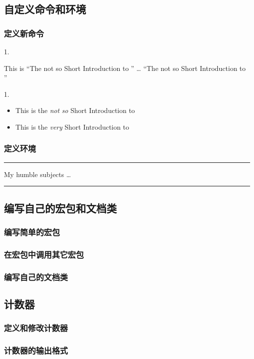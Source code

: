 \documentclass[12pt,UTF8]{ctexart}%
\begin{document}
\subsection{自定义命令和环境}

\subsubsection{定义新命令}

1.\par
\newcommand{\tnss}{The not
so Short Introduction to
\LaTeXe}
This is ``\tnss'' \ldots{}
``\tnss''

1.\par
\newcommand{\txsit}[1]
{This is the \emph{#1} Short
Introduction to \LaTeXe}
\begin{itemize}
\item \txsit{not so}
\item \txsit{very}
\end{itemize}

\subsubsection{定义环境}

\newenvironment{king}
{\rule{1ex}{1ex}%
\hspace{\stretch{1}}}
{%
\rule{1ex}{1ex}}
\begin{king}
My humble subjects \ldots
\end{king}

\subsection{编写自己的宏包和文档类}

\subsubsection{编写简单的宏包}


\subsubsection{在宏包中调用其它宏包}


\subsubsection{编写自己的文档类}


\subsection{计数器}

\subsubsection{定义和修改计数器}

\subsubsection{计数器的输出格式}
\end{document}
